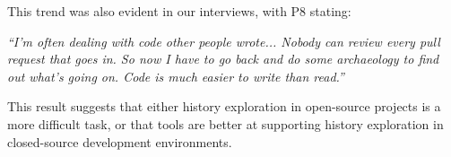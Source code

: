 This trend was also evident in our interviews, with P8 stating:

\begin{displayquote}
\textit{``I'm often dealing with code other people wrote... Nobody can review every pull request that goes in. So now I have to go back and do some archaeology to find out what's going on. Code is much easier to write than read.''}
\end{displayquote}

This result suggests that either history exploration in open-source projects is a more difficult task, or that tools are better at supporting history exploration in closed-source development environments.

